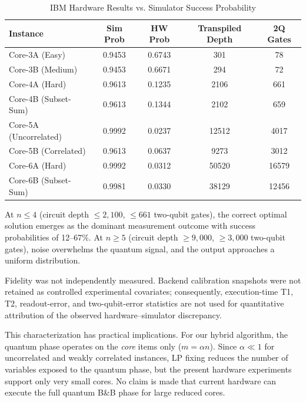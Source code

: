 \documentclass[conference]{IEEEtran} \IEEEoverridecommandlockouts
\begin{document}
\begin{table}[htbp]
\caption{IBM Hardware Results vs. Simulator Success Probability}
\label{tab:hardware}
\begin{center}
\footnotesize
\begin{tabular}{lcccc}
\toprule
\textbf{Instance} & \textbf{Sim Prob} & \textbf{HW Prob} & \textbf{Transpiled Depth} & \textbf{2Q Gates} \\
\midrule
Core-3A (Easy) & 0.9453 & 0.6743 & 301 & 78 \\
Core-3B (Medium) & 0.9453 & 0.6671 & 294 & 72 \\
Core-4A (Hard) & 0.9613 & 0.1235 & 2106 & 661 \\
Core-4B (Subset-Sum) & 0.9613 & 0.1344 & 2102 & 659 \\
Core-5A (Uncorrelated) & 0.9992 & 0.0237 & 12512 & 4017 \\
Core-5B (Correlated) & 0.9613 & 0.0637 & 9273 & 3012 \\
Core-6A (Hard) & 0.9992 & 0.0312 & 50520 & 16579 \\
Core-6B (Subset-Sum) & 0.9981 & 0.0330 & 38129 & 12456 \\
\bottomrule
\end{tabular}
\end{center}
\end{table}

At $n \leq 4$ (circuit depth $\leq 2{,}100$, $\leq 661$ two-qubit gates), the correct optimal solution emerges as the dominant measurement outcome with success probabilities of 12--67\%. At $n \geq 5$ (circuit depth $\geq 9{,}000$, $\geq 3{,}000$ two-qubit gates), noise overwhelms the quantum signal, and the output approaches a uniform distribution.

Fidelity was not independently measured. Backend calibration snapshots were not retained as controlled experimental covariates; consequently, execution-time T1, T2, readout-error, and two-qubit-error statistics are not used for quantitative attribution of the observed hardware--simulator discrepancy.

This characterization has practical implications. For our hybrid algorithm, the quantum phase operates on the \textit{core} items only ($m = \alpha n$). Since $\alpha \ll 1$ for uncorrelated and weakly correlated instances, LP fixing reduces the number of variables exposed to the quantum phase, but the present hardware experiments support only very small cores. No claim is made that current hardware can execute the full quantum B\&B phase for large reduced cores.
\end{document}
